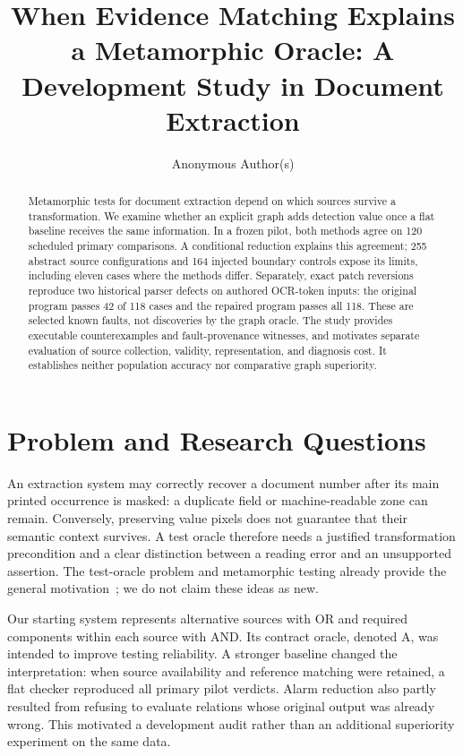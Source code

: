 \documentclass[sigconf,review,anonymous]{acmart}
\title[Evidence Matching in a Metamorphic Oracle]{When Evidence Matching Explains a Metamorphic Oracle: A Development Study in Document Extraction}
\author{Anonymous Author(s)}
\begin{document}
\begin{abstract}
Metamorphic tests for document extraction depend on which sources survive a transformation. We examine whether an explicit graph adds detection value once a flat baseline receives the same information. In a frozen pilot, both methods agree on 120 scheduled primary comparisons. A conditional reduction explains this agreement; 255 abstract source configurations and 164 injected boundary controls expose its limits, including eleven cases where the methods differ. Separately, exact patch reversions reproduce two historical parser defects on authored OCR-token inputs: the original program passes 42 of 118 cases and the repaired program passes all 118. These are selected known faults, not discoveries by the graph oracle. The study provides executable counterexamples and fault-provenance witnesses, and motivates separate evaluation of source collection, validity, representation, and diagnosis cost. It establishes neither population accuracy nor comparative graph superiority.
\end{abstract}
\maketitle

\section{Problem and Research Questions}
An extraction system may correctly recover a document number after its main printed occurrence is masked: a duplicate field or machine-readable zone can remain. Conversely, preserving value pixels does not guarantee that their semantic context survives. A test oracle therefore needs a justified transformation precondition and a clear distinction between a reading error and an unsupported assertion. The test-oracle problem and metamorphic testing already provide the general motivation~\cite{barr2015oracle,segura2016survey}; we do not claim these ideas as new.

Our starting system represents alternative sources with OR and required components within each source with AND. Its contract oracle, denoted A, was intended to improve testing reliability. A stronger baseline changed the interpretation: when source availability and reference matching were retained, a flat checker reproduced all primary pilot verdicts. Alarm reduction also partly resulted from refusing to evaluate relations whose original output was already wrong. This motivated a development audit rather than an additional superiority experiment on the same data.
\end{document}
